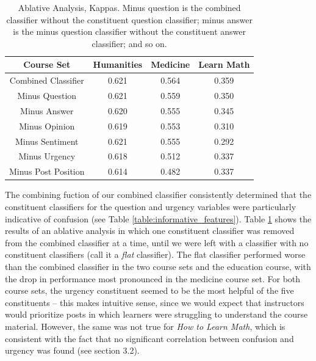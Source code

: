 \documentclass{edm_template}
\begin{document}
\begin{table}
       \centering
       \begin{tabular}{|c|c|c|c|}
       \hline
       Course Set           & Humanities & Medicine & Learn Math \\ \hline
       Combined Classifier  & 0.621      & 0.564    & 0.359 \\ \hline\hline
       Minus Question       & 0.621      & 0.559    & 0.350 \\ \hline
       Minus Answer         & 0.620      & 0.555    & 0.345 \\ \hline
       Minus Opinion        & 0.619      & 0.553    & 0.310 \\ \hline
       Minus Sentiment      & 0.621      & 0.555    & 0.292 \\ \hline
       Minus Urgency        & 0.618      & 0.512    & 0.337 \\ \hline
       Minus Post Position      & 0.614      & 0.482    & 0.337 \\ \hline
       \end{tabular}
       \caption{\textnormal{
       Ablative Analysis, Kappas. Minus question is the combined classifier without the constituent question classifier; minus answer is the minus question classifier without the constituent answer classifier; and so on.
       }} %
       \label{table:ablative} %
\end{table}

The combining fuction of our combined classifier consistently determined that the constituent classifiers for the question and urgency variables were particularly indicative of confusion (see Table \ref{table:informative_features}). Table \ref{table:ablative} shows the results of an ablative analysis in which one constituent classifier was removed from the combined classifier at a time, until we were left with a classifier with no constituent classifiers (call it a \emph{flat} classifier). The flat classifier performed worse than the combined classifier in the two course sets and the education course, with the drop in performance most pronounced in the medicine course set. For both course sets, the urgency constituent seemed to be the most helpful of the five constituents -- this makes intuitive sense, since we would expect that instructors would prioritize posts in which learners were struggling to understand the course material. However, the same was not true for \emph{How to Learn Math}, which is consistent with the fact that no significant correlation between confusion and urgency was found (see section 3.2).
\end{document}
